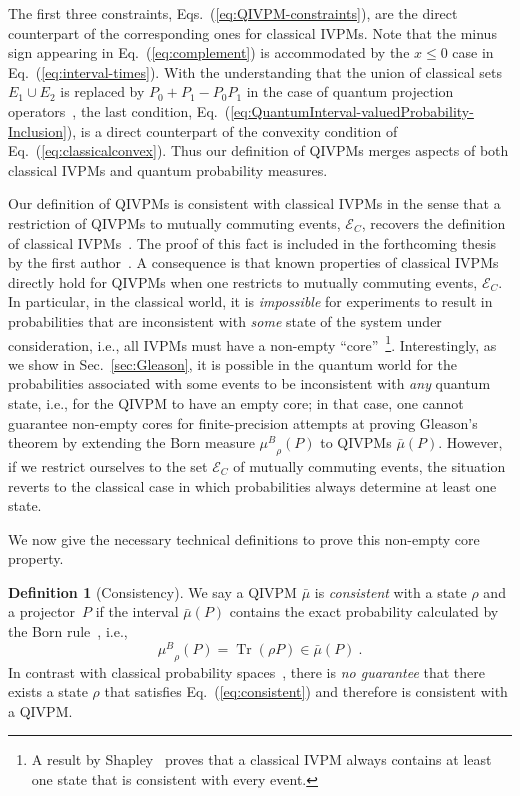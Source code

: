 \documentclass[english,reprint, aps, prl,superscriptaddress, showpacs,
showkeys, longbibliography, amsmath, amssymb, floatfix]{revtex4-1}
\theoremstyle{plain}
\theoremstyle{definition}
\newtheorem{definition}{Definition}
\newcommand{\events}{\ensuremath{\mathcal{E}}}
\newcommand{\Tr}{\ensuremath{\mathop{\mathrm{Tr}}\nolimits}}
\newcommand{\muB}{\ensuremath{\mu^{B}}}
\newcommand{\eventsC}{\ensuremath{\events_{C}}}
\begin{document}
\noindent The first three constraints,
Eqs.~(\ref{eq:QIVPM-constraints}), are the direct counterpart of the
corresponding ones for classical IVPMs.  Note that the minus sign
appearing in Eq.~(\ref{eq:complement}) is accommodated by the $x\le0$ case in
Eq.~(\ref{eq:interval-times}).  With the understanding that
the union of classical sets $E_1\cup E_2$ is replaced by
$P_0+P_1-P_0P_1$ in the case of quantum projection
operators~\cite{Griffiths2003}, the last condition,
Eq.~(\ref{eq:QuantumInterval-valuedProbability-Inclusion}), is a
direct counterpart of the convexity condition of
Eq.~(\ref{eq:classicalconvex}). Thus our definition of QIVPMs merges
aspects of both classical IVPMs and quantum probability measures.

Our definition of QIVPMs is consistent with classical IVPMs in the
sense that a restriction of QIVPMs to mutually commuting events,
$\eventsC$, recovers the definition of classical
IVPMs~\cite{JamisonLodwick2004}. The proof of this fact is included in the
forthcoming thesis by the first author~\cite{TaiThesis2018}. A
consequence is that known properties of classical IVPMs
directly hold for QIVPMs when one restricts to mutually commuting
events, $\eventsC$. In particular, in the classical world, it is
\emph{impossible} for experiments to result in probabilities that are
inconsistent with \emph{some} state of the system under consideration,
i.e., all IVPMs must have a non-empty ``core''~\footnote{A result by
  Shapley~\cite{Shapley1971,GilboaSchmeidler1994,NgMoYeh1997,Grabisch2016}
  proves that a classical IVPM always contains at least one state that
  is consistent with every event.}. Interestingly, as we show in
Sec.~\ref{sec:Gleason}, it is possible in the quantum world for the
probabilities associated with some events to be inconsistent with
\emph{any} quantum state, i.e., for the QIVPM to have an empty core;
in that case, one cannot guarantee non-empty cores for finite-precision
attempts at proving Gleason's theorem by extending the Born measure
$\muB_{\rho}\left(P\right)$ to QIVPMs
$\bar{\mu}\left(P\right)$. However, if we restrict ourselves to the set
$\eventsC$ of mutually commuting events, 
the situation reverts to the classical case in which
probabilities always determine at least one state.

We now give the necessary technical definitions to prove this
non-empty core property.
\begin{definition}[Consistency]\label{def:Consistency} We say a QIVPM
$\bar{\mu}$ is
\emph{consistent} with a state $\rho$ and a projector~$P$ if the
interval $\bar{\mu}(P)$ contains the exact probability calculated by
the Born rule~\cite{Born1983bibTeX,Mermin2007,Jaeger2007}, i.e.,
  \begin{equation}
  \muB_{\rho}\left(P\right) = \Tr\left(\rho
  P\right)\in\bar{\mu}\left(P\right)\ .\label{eq:consistent}
  \end{equation}
In contrast with classical probability spaces~\cite{Note1}, there is \emph{no
guarantee} that there exists a state $\rho$ that satisfies
Eq.~(\ref{eq:consistent}) and therefore is consistent with a QIVPM.
\end{definition}
\end{document}
